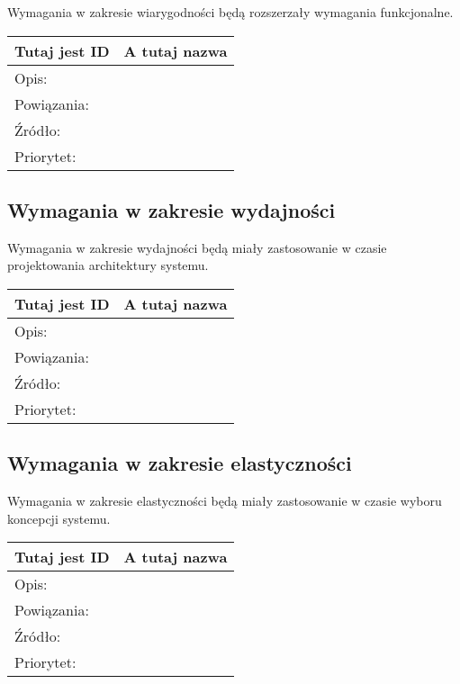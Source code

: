 \documentclass[a4paper,10pt]{article}
\begin{document}
Wymagania w zakresie wiarygodności będą rozszerzały wymagania funkcjonalne. 


\begin{tabular}{|p{3cm}|p{9cm}|} \hline

Tutaj jest ID & A tutaj nazwa \\ \hline
Opis: &  \\ \hline
Powiązania: &  \\ \hline
Źródło: &  \\ \hline
Priorytet: &  \\ \hline

\end{tabular}


\subsection{Wymagania w zakresie wydajności}

Wymagania w zakresie wydajności będą miały zastosowanie w czasie projektowania architektury systemu.


\begin{tabular}{|p{3cm}|p{9cm}|} \hline

Tutaj jest ID & A tutaj nazwa \\ \hline
Opis: &  \\ \hline
Powiązania: &  \\ \hline
Źródło: &  \\ \hline
Priorytet: &  \\ \hline

\end{tabular}


\subsection{Wymagania w zakresie elastyczności}

Wymagania w zakresie elastyczności będą miały zastosowanie w czasie wyboru koncepcji systemu.


\begin{tabular}{|p{3cm}|p{9cm}|} \hline

Tutaj jest ID & A tutaj nazwa \\ \hline
Opis: &  \\ \hline
Powiązania: &  \\ \hline
Źródło: &  \\ \hline
Priorytet: &  \\ \hline

\end{tabular}
\end{document}

